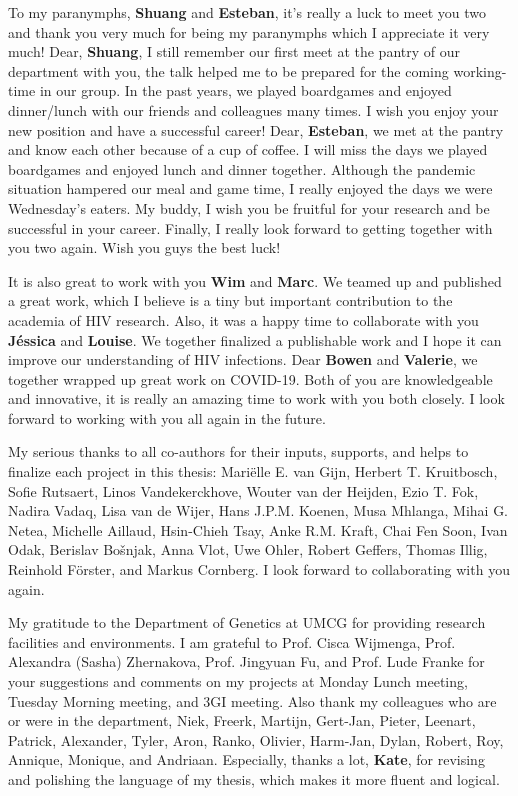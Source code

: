 \documentclass{book}
\begin{document}
\begin{refsection}
To my paranymphs, \textbf{Shuang} and \textbf{Esteban}, it's really a luck to meet you two and thank you very much for being my paranymphs which I appreciate it very much!
Dear, \textbf{Shuang}, I still remember our first meet at the pantry of our department with you, the talk helped me to be prepared for the coming working-time in our group.
In the past years, we played boardgames and enjoyed dinner/lunch with our friends and colleagues many times.
I wish you enjoy your new position and have a successful career!
Dear, \textbf{Esteban}, we met at the pantry and know each other because of a cup of coffee.
I will miss the days we played boardgames and enjoyed lunch and dinner together.
Although the pandemic situation hampered our meal and game time, I really enjoyed the days we were Wednesday's eaters.
My buddy, I wish you be fruitful for your research and be successful in your career.
Finally, I really look forward to getting together with you two again.
Wish you guys the best luck!

It is also great to work with you \textbf{Wim} and \textbf{Marc}.
We teamed up and published a great work, which I believe is a tiny but important contribution to the academia of HIV research.
Also, it was a happy time to collaborate with you \textbf{Jéssica} and \textbf{Louise}.
We together finalized a publishable work and I hope it can improve our understanding of HIV infections.
Dear \textbf{Bowen} and \textbf{Valerie}, we together wrapped up great work on COVID-19.
Both of you are knowledgeable and innovative, it is really an amazing time to work with you both closely.
I look forward to working with you all again in the future.

My serious thanks to all co-authors for their inputs, supports, and helps to finalize each project in this thesis: Mariëlle E. van Gijn, Herbert T. Kruitbosch, Sofie Rutsaert, Linos Vandekerckhove, Wouter van der Heijden, Ezio T. Fok, Nadira Vadaq, Lisa van de Wijer, Hans J.P.M. Koenen, Musa Mhlanga, Mihai G. Netea, Michelle Aillaud, Hsin-Chieh Tsay, Anke R.M. Kraft, Chai Fen Soon, Ivan Odak, Berislav Bošnjak, Anna Vlot, Uwe Ohler, Robert Geffers, Thomas Illig, Reinhold Förster, and Markus Cornberg.
I look forward to collaborating with you again.

My gratitude to the Department of Genetics at UMCG for providing research facilities and environments.
I am grateful to Prof. Cisca Wijmenga, Prof. Alexandra (Sasha) Zhernakova, Prof. Jingyuan Fu, and Prof. Lude Franke for your suggestions and comments on my projects at Monday Lunch meeting, Tuesday Morning meeting, and 3GI meeting.
Also thank my colleagues who are or were in the department, Niek, Freerk, Martijn, Gert-Jan, Pieter, Leenart, Patrick, Alexander, Tyler, Aron, Ranko, Olivier, Harm-Jan, Dylan, Robert, Roy, Annique, Monique, and Andriaan.
Especially, thanks a lot, \textbf{Kate}, for revising and polishing the language of my thesis, which makes it more fluent and logical.


\end{refsection}
\end{document}
